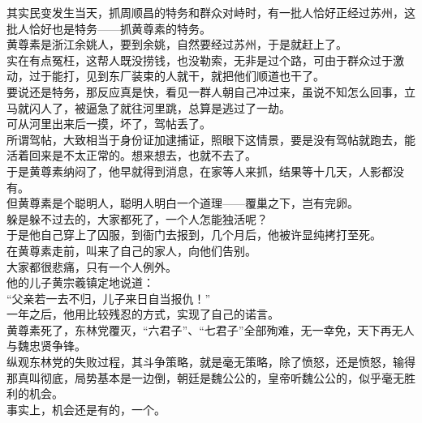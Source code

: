 \begin{multicols}{\theparacolNo}
其实民变发生当天，抓周顺昌的特务和群众对峙时，有一批人恰好正经过苏州，这批人恰好也是特务——抓黄尊素的特务。\\

黄尊素是浙江余姚人，要到余姚，自然要经过苏州，于是就赶上了。\\

实在有点冤枉，这帮人既没捞钱，也没勒索，无非是过个路，可由于群众过于激动，过于能打，见到东厂装束的人就干，就把他们顺道也干了。\\

要说还是特务，那反应真是快，看见一群人朝自己冲过来，虽说不知怎么回事，立马就闪人了，被逼急了就往河里跳，总算是逃过了一劫。\\

可从河里出来后一摸，坏了，驾帖丢了。\\

所谓驾帖，大致相当于身份证加逮捕证，照眼下这情景，要是没有驾帖就跑去，能活着回来是不太正常的。想来想去，也就不去了。\\

于是黄尊素纳闷了，他早就得到消息，在家等人来抓，结果等十几天，人影都没有。\\

但黄尊素是个聪明人，聪明人明白一个道理——覆巢之下，岂有完卵。\\

躲是躲不过去的，大家都死了，一个人怎能独活呢？\\

于是他自己穿上了囚服，到衙门去报到，几个月后，他被许显纯拷打至死。\\

在黄尊素走前，叫来了自己的家人，向他们告别。\\

大家都很悲痛，只有一个人例外。\\

他的儿子黄宗羲镇定地说道：\\

“父亲若一去不归，儿子来日自当报仇！”\\

一年之后，他用比较残忍的方式，实现了自己的诺言。\\

黄尊素死了，东林党覆灭，“六君子”、“七君子”全部殉难，无一幸免，天下再无人与魏忠贤争锋。\\

纵观东林党的失败过程，其斗争策略，就是毫无策略，除了愤怒，还是愤怒，输得那真叫彻底，局势基本是一边倒，朝廷是魏公公的，皇帝听魏公公的，似乎毫无胜利的机会。\\

事实上，机会还是有的，一个。\\
\ifnum{}
	\end{multicols}
\fi
\newpage
